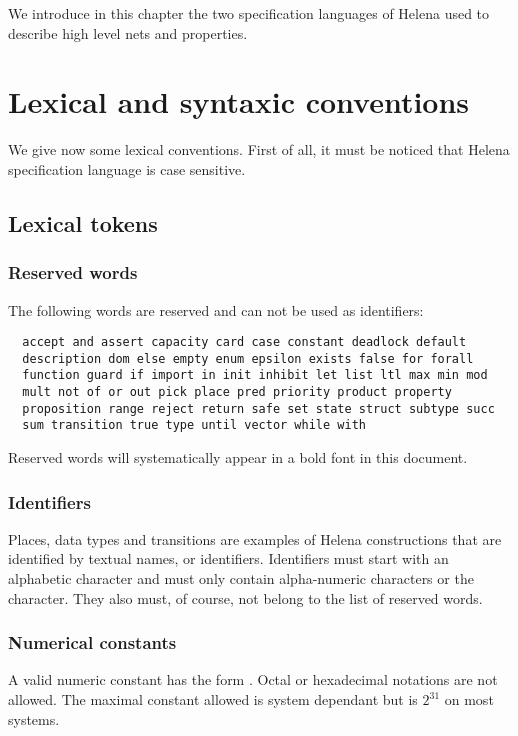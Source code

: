 We introduce in this chapter the two specification languages of Helena
used to describe high level nets and properties.

\section{Lexical and syntaxic conventions}

We give now some lexical conventions.  First of all, it must be
noticed that Helena specification language is case sensitive.

\subsection{Lexical tokens}

\subsubsection{Reserved words}
The following words are reserved and can not be used as identifiers:

\begin{lstlisting}
  accept and assert capacity card case constant deadlock default
  description dom else empty enum epsilon exists false for forall
  function guard if import in init inhibit let list ltl max min mod
  mult not of or out pick place pred priority product property
  proposition range reject return safe set state struct subtype succ
  sum transition true type until vector while with
\end{lstlisting}

Reserved words will systematically appear in a bold font in this
document.

\subsubsection{Identifiers}
Places, data types and transitions are examples of Helena
constructions that are identified by textual names, or identifiers.
Identifiers must start with an alphabetic character and must only
contain alpha-numeric characters or the  character.  They also
must, of course, not belong to the list of reserved words.

\subsubsection{Numerical constants}
A valid numeric constant has the form \LS{[0-9][0-9]*}.  Octal or
hexadecimal notations are not allowed.  The maximal constant allowed
is system dependant but is $2^{31}$ on most systems.

